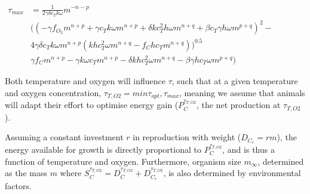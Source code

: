\documentclass{article}
\begin{document}
\begin{math}
     \begin{aligned}
\tau_{max} &= \frac{1}{2 \gamma \delta c_T k \omega} m^{-n-p} \\
           &((-\gamma f_{O_2} m^{n+p}+\gamma c_T k \omega m^{n+p}+\delta k c_T^2 h \omega m^{n+q}+\beta c_T \gamma h \omega m^{p+q})^2 - \\ 
           &4 \gamma \delta c_T k \omega m^{n+p} (k h c_T^2 \omega m^{n+q}-f_C h c_T m^{n+q}))^{0.5} \\
          &\gamma f_C m^{n+p}-\gamma k \omega c_T m^{n+p}-\delta k h c_T^2 \omega m^{n+q}-\beta \gamma h c_T \omega m^{p+q})
          \end{aligned}
\end{math}

Both temperature and oxygen will influence $\tau$, such that at a given temperature and oxygen concentration, $\tau_{T,O2} = min{\tau_{opt},\tau_{max}}$, meaning we assume that animals will adapt their effort to optimise energy gain ($P_C^{\tau_{T,O2}}$, the net production at $\tau_{T,O2}$).

Assuming a constant investment $r$ in reproduction with weight ($D_{C_r}=rm$), the energy available for growth is directly proportional to $P_C^{\tau_{T,O2}}$, and is thus a function of temperature and oxygen. Furthermore, organism size $m_{\infty}$, determined as the mass $m$ where $S_C^{\tau_{T,O2}} = D_C^{\tau_{T,O2}} + D_{C_r}^{\tau_{T,O2}}$, is also determined by environmental factors.
\end{document}
